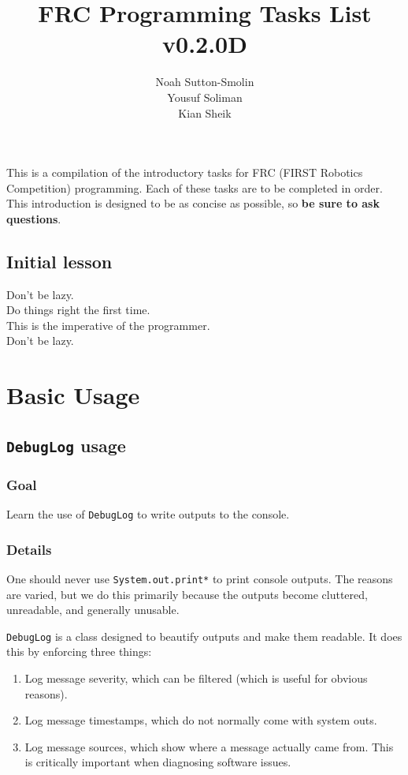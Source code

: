 \documentclass[a4paper]{article}
\title{FRC Programming Tasks List v0.2.0D}
\author{Noah Sutton-Smolin\\Yousuf Soliman\\Kian Sheik}
\begin{document}
\setcounter{tocdepth}{2}\maketitle\tableofcontents\pagebreak

This is a compilation of the introductory tasks for FRC (FIRST Robotics Competition) programming. Each of these tasks are to be completed in order. This introduction is designed to be as concise as possible, so \textbf{be sure to ask questions}.

\subsection{Initial lesson}
Don't be lazy.\\Do things right the first time.\\This is the imperative of the programmer.\\Don't be lazy.

\section{Basic Usage}
\subsection{\lstinline{DebugLog} usage}
\subsubsection{Goal} Learn the use of \lstinline{DebugLog} to write outputs to the console.
\subsubsection{Details} One should never use \lstinline{System.out.print*} to print console outputs. The reasons are varied, but we do this primarily because the outputs become cluttered, unreadable, and generally unusable. 

\lstinline{DebugLog} is a class designed to beautify outputs and make them readable. It does this by enforcing three things:
\begin{enumerate}\item{Log message severity, which can be filtered (which is useful for obvious reasons).}\item{Log message timestamps, which do not normally come with system outs.}\item{Log message sources, which show where a message actually came from. This is critically important when diagnosing software issues.}\end{enumerate}
\end{document}
